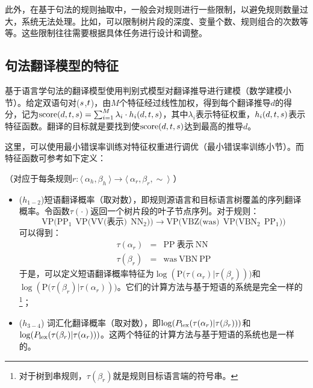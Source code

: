 \parinterval 此外，在基于句法的规则抽取中，一般会对规则进行一些限制，以避免规则数量过大，系统无法处理。比如，可以限制树片段的深度、变量个数、规则组合的次数等等。这些限制往往需要根据具体任务进行设计和调整。


\subsection{句法翻译模型的特征}

\parinterval 基于语言学句法的翻译模型使用判别式模型对翻译推导进行建模（{\chapterseven}数学建模小节）。给定双语句对(${s}$,${t}$)，由$M$个特征经过线性加权，得到每个翻译推导$d$的得分，记为$\textrm{score(}d,{t},{s})=\sum_{i=1}^{M} \lambda_i \cdot h_{i}(d,{t},{s})$，其中$\lambda_i$表示特征权重，$h_{i}(d,{t},{s})$表示特征函数。翻译的目标就是要找到使$\textrm{score(}d,{t},{s})$达到最高的推导$d$。

\parinterval 这里，可以使用最小错误率训练对特征权重进行调优（{\chapterseven}最小错误率训练小节）。而特征函数可参考如下定义：

\vspace{0.5em}
（对应于每条规则$r : \langle\  \alpha_h, \beta_h\ \rangle \to \langle\ \alpha_r, \beta_r, \sim\ \rangle$ ）

\begin{itemize}
\vspace{0.5em}
\item ($h_{1-2}$)短语翻译概率（取对数），即规则源语言和目标语言树覆盖的序列翻译概率。令函数$\tau(\cdot)$返回一个树片段的叶子节点序列。对于规则：
\begin{displaymath}
\textrm{VP(}\textrm{PP}_1\ \ \textrm{VP(VV(表示)}\ \ \textrm{NN}_2\textrm{))} \rightarrow \textrm{VP(VBZ(was)}\ \ \textrm{VP(}\textrm{VBN}_2\ \ \textrm{PP}_1\textrm{))}
\end{displaymath}
\noindent 可以得到：
\begin{eqnarray}
\tau( \alpha_r ) & = & \textrm{PP}\ \textrm{表示}\ \textrm{NN} \nonumber \\
\tau( \beta_r ) & = & \textrm{was}\ \textrm{VBN}\ \textrm{PP} \nonumber
\end{eqnarray}
\noindent 于是，可以定义短语翻译概率特征为$\log(\textrm{P(}\tau( \alpha_r )|\tau( \beta_r )))$和$\log(\textrm{P(}\tau( \beta_r )|\tau( \alpha_r )))$。它们的计算方法与基于短语的系统是完全一样的\footnote[9]{对于树到串规则，$\tau( \beta_r )$就是规则目标语言端的符号串。}；
\vspace{0.5em}
\item ($h_{3-4}$) 词汇化翻译概率（取对数），即$\log({P}_{\textrm{lex}}(\tau( \alpha_r )|\tau( \beta_r )))$和$\log({P}_{\textrm{lex}}(\tau( \beta_r )|\tau( \alpha_r )))$。这两个特征的计算方法与基于短语的系统也是一样的。
\vspace{0.5em}
\end{itemize}

